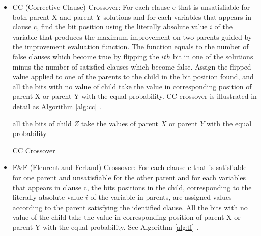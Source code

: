\begin{itemize}
	\item
	      CC (Corrective Clause) Crossover: For each clause c that is unsatisfiable for
	      both parent X and parent Y solutions and for each variables that appears in
	      clause c, find the bit position using the literally absolute value
	      $i$ of the variable that produces the maximum improvement
	      on two parents guided by the improvement evaluation function. The function
	      equals to the number of false clauses which become true by flipping the
	      $ith$ bit in one of the solutions minus the number of
	      satisfied clauses which become false. Assign the flipped value applied to one
	      of the parents to the child in the bit position found, and all the bits with
	      no value of child take the value in corresponding position of parent X or
	      parent Y with the equal probability. CC crossover is illustrated in detail as
	      Algorithm \ref{alg:cc} \parencite{lardeux2006gasat}.

	      \begin{algorithm}
		      \SetAlgoLined
		      \BlankLine
		      all the bits of child $Z$ take the values of parent
		      $X$ or parent $Y$ with the equal
		      probability\;  \caption{CC Crossover}
		      \label{alg:cc}
	      \end{algorithm}

	\item
	      F\&F (Fleurent and Ferland) Crossover: For each clause c that is satisfiable
	      for one parent and unsatisfiable for the other parent and for each variables
	      that appears in clause c, the bits positions in the child, corresponding to
	      the literally absolute value $i$ of the variable in
	      parents, are assigned values according to the parent satisfying the identified
	      clause. All the bits with no value of the child take the value in
	      corresponding position of parent X or parent Y with the equal probability. See
	      Algorithm \ref{alg:ff} \parencite{lardeux2006gasat}.


\end{itemize}
